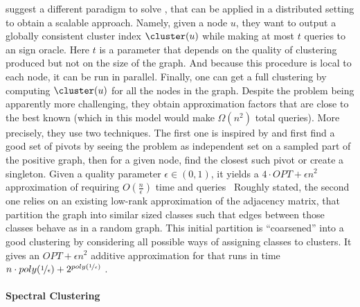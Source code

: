\Textcite{Bonchi2013} suggest a different paradigm to solve \pcc{}, that can be applied in a
distributed setting to obtain a scalable approach. Namely, given a node $u$, they want to output a
globally consistent cluster index $\cluster(u)$ while making at most $t$ queries to an sign oracle.
Here $t$ is a parameter that depends on the quality of clustering produced but not on the size of
the graph. And because this procedure is local to each node, it can be run in parallel. Finally, one
can get a full clustering by computing $\cluster(u)$ for all the nodes in the graph. Despite the
problem being apparently more challenging, they obtain approximation factors that are close to the
best known (which in this model would make $\Omega(n^2)$ total queries). More precisely, they use
two techniques.
The first one is inspired by \ccpivot{} and first find a good set of pivots by seeing the problem as
independent set on a sampled part of the positive graph, then for a given node, find the closest
such pivot or create a singleton. Given a quality parameter $\epsilon\in(0,1)$, it yields a $4\cdot
OPT + \epsilon n^2$ approximation of \mind{} requiring $O(\frac{n}{\epsilon})$ time and
queries~\autocite[Theorem 3.3]{Bonchi2013}
Roughly stated, the second one relies on an existing low-rank approximation of the adjacency matrix,
that partition the graph into similar sized classes such that edges between those classes behave as
in a random graph. This initial partition is \enquote{coarsened} into a good clustering by
considering all possible ways of assigning classes to clusters. It gives an $OPT + \epsilon n^2$
additive approximation  for \mind{} that runs in time $n \cdot poly(\nicefrac{1}{\epsilon}) +
2^{poly(\nicefrac{1}{\epsilon})}$ \autocite[Corollary 3.7]{Bonchi2013}.

\paragraph{Spectral Clustering}

